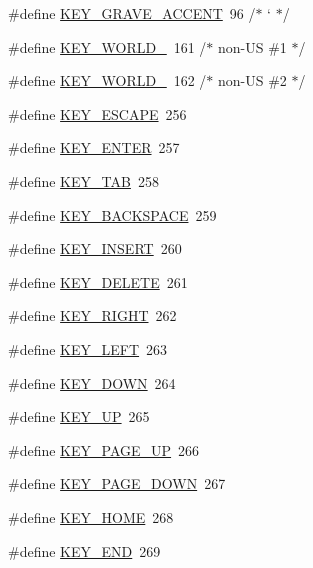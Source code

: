 \begin{DoxyCompactItemize}
\item 
\#define \hyperlink{group___keys_ga3ef4ad20913d5b8bfbd2842dd86c17a1}{K\-E\-Y\-\_\-\-G\-R\-A\-V\-E\-\_\-\-A\-C\-C\-E\-N\-T}~96  /$\ast$ ` $\ast$/
\item 
\#define \hyperlink{group___keys_gadc3ff27f726f48c448302ef601d0db4e}{K\-E\-Y\-\_\-\-W\-O\-R\-L\-D\-\_}~161 /$\ast$ non-\/U\-S \#1 $\ast$/
\item 
\#define \hyperlink{group___keys_gaedfaa7b5516040ad0aca1b7cd172f706}{K\-E\-Y\-\_\-\-W\-O\-R\-L\-D\-\_}~162 /$\ast$ non-\/U\-S \#2 $\ast$/
\item 
\#define \hyperlink{group___keys_ga6c8ee53908fc5d6df19f1da8502b38dc}{K\-E\-Y\-\_\-\-E\-S\-C\-A\-P\-E}~256
\item 
\#define \hyperlink{group___keys_gabaee5edb96e542206ae6c8102ac228af}{K\-E\-Y\-\_\-\-E\-N\-T\-E\-R}~257
\item 
\#define \hyperlink{group___keys_ga4fa9fbcc86d5ee884a821459a87f3a54}{K\-E\-Y\-\_\-\-T\-A\-B}~258
\item 
\#define \hyperlink{group___keys_ga1e9a449dee19c686a2af4edcdc1a1042}{K\-E\-Y\-\_\-\-B\-A\-C\-K\-S\-P\-A\-C\-E}~259
\item 
\#define \hyperlink{group___keys_gaaa67a531439790dc20ed750f482d4a3e}{K\-E\-Y\-\_\-\-I\-N\-S\-E\-R\-T}~260
\item 
\#define \hyperlink{group___keys_ga1d654db2e04ad94a58f880fb9e127ad6}{K\-E\-Y\-\_\-\-D\-E\-L\-E\-T\-E}~261
\item 
\#define \hyperlink{group___keys_ga004194639b9ad76cea01d9e93716d4d6}{K\-E\-Y\-\_\-\-R\-I\-G\-H\-T}~262
\item 
\#define \hyperlink{group___keys_gaf4d1b8a2912354646c74cf36c69f8223}{K\-E\-Y\-\_\-\-L\-E\-F\-T}~263
\item 
\#define \hyperlink{group___keys_ga203163bc0189184a1de6ca8d1e53c6bf}{K\-E\-Y\-\_\-\-D\-O\-W\-N}~264
\item 
\#define \hyperlink{group___keys_gafa086fc916a81e7fd348ec00cf786916}{K\-E\-Y\-\_\-\-U\-P}~265
\item 
\#define \hyperlink{group___keys_ga148dd567ca75b9320e8862d54139406a}{K\-E\-Y\-\_\-\-P\-A\-G\-E\-\_\-\-U\-P}~266
\item 
\#define \hyperlink{group___keys_ga83760e7f00c16682c746c2844c712b01}{K\-E\-Y\-\_\-\-P\-A\-G\-E\-\_\-\-D\-O\-W\-N}~267
\item 
\#define \hyperlink{group___keys_gaf6806366178266b3eaf1fb16f991cbee}{K\-E\-Y\-\_\-\-H\-O\-M\-E}~268
\item 
\#define \hyperlink{group___keys_ga912861b945e779c29f718cdcd62be10c}{K\-E\-Y\-\_\-\-E\-N\-D}~269

\end{DoxyCompactItemize}
